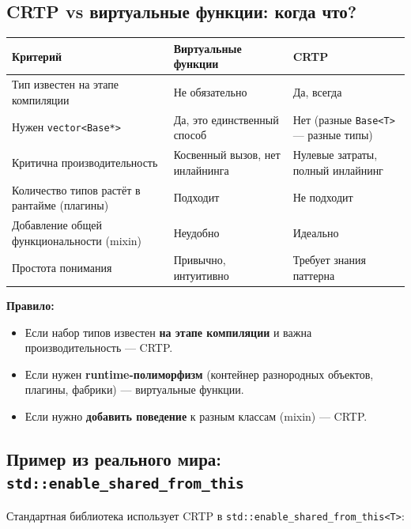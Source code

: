 \documentclass[a4paper,12pt]{article}
\begin{document}
\subsection{CRTP vs виртуальные функции: когда что?}

\begin{center}
\begin{tabular}{lp{5.5cm}p{5.5cm}}
\toprule
\textbf{Критерий} & \textbf{Виртуальные функции} & \textbf{CRTP} \\
\midrule
Тип известен на этапе компиляции
    & Не обязательно
    & Да, всегда \\
\addlinespace
Нужен \texttt{vector<Base*>}
    & Да, это единственный способ
    & Нет (разные \texttt{Base<T>} --- разные типы) \\
\addlinespace
Критична производительность
    & Косвенный вызов, нет инлайнинга
    & Нулевые затраты, полный инлайнинг \\
\addlinespace
Количество типов растёт в рантайме (плагины)
    & Подходит
    & Не подходит \\
\addlinespace
Добавление общей функциональности (mixin)
    & Неудобно
    & Идеально \\
\addlinespace
Простота понимания
    & Привычно, интуитивно
    & Требует знания паттерна \\
\bottomrule
\end{tabular}
\end{center}

\textbf{Правило:}
\begin{itemize}
    \item Если набор типов известен \textbf{на этапе компиляции} и важна
          производительность --- CRTP.
    \item Если нужен \textbf{runtime-полиморфизм} (контейнер разнородных объектов,
          плагины, фабрики) --- виртуальные функции.
    \item Если нужно \textbf{добавить поведение} к разным классам (mixin) --- CRTP.
\end{itemize}

\subsection{Пример из реального мира: \texttt{std::enable\_shared\_from\_this}}

Стандартная библиотека использует CRTP в
\texttt{std::enable\_shared\_from\_this<T>}:
\end{document}
